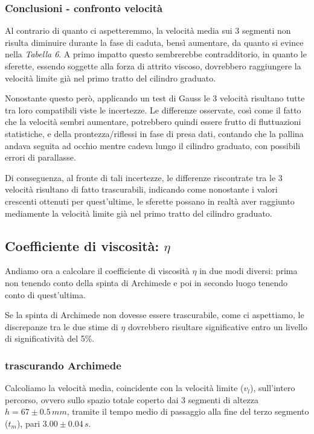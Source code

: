 \documentclass{article}
\begin{document}
\subsubsection{Conclusioni - confronto velocità}
Al contrario di quanto ci aspetteremmo, la velocità media sui 3 segmenti non risulta diminuire durante la fase di caduta, bensì aumentare, da quanto si evince nella \textit{Tabella 6}. A primo impatto questo sembrerebbe contradditorio, in quanto le sferette, essendo soggette alla forza di attrito viscoso, dovrebbero raggiungere la velocità limite già nel primo tratto del cilindro graduato.

Nonostante questo però, applicando un test di Gauss le 3 velocità risultano tutte tra loro compatibili viste le incertezze. Le differenze osservate, così come il fatto che la velocità sembri aumentare, potrebbero quindi essere frutto di fluttuazioni statistiche, e della prontezza/riflessi in fase di presa dati, contando che la pallina andava seguita ad occhio mentre cadeva lungo il cilindro graduato, con possibili errori di parallasse.

Di conseguenza, al fronte di tali incertezze, le differenze riscontrate tra le 3 velocità risultano di fatto trascurabili, indicando come nonostante i valori crescenti ottenuti per quest'ultime, le sferette possano in realtà aver raggiunto mediamente la velocità limite già nel primo tratto del cilindro graduato. 

\subsection{Coefficiente di viscosità: $\eta$}
Andiamo ora a calcolare il coefficiente di viscosità $\eta$ in due modi diversi: prima non tenendo conto della spinta di Archimede e poi in secondo luogo tenendo conto di quest'ultima. 

Se la spinta di Archimede non dovesse essere trascurabile, come ci aspettiamo, le discrepanze tra le due stime di $\eta$ dovrebbero risultare significative entro un livello di significatività del 5\%.
\vspace{0.2cm}
\subsubsection{\bm{$\eta$} trascurando Archimede}
Calcoliamo la velocità media, coincidente con la velocità limite ($v_l$), sull'intero percorso, ovvero sullo spazio totale coperto dai 3 segmenti di altezza $h = 67 \pm 0.5\,mm$, tramite il tempo medio di passaggio alla fine del terzo segmento ($t_m$), pari $3.00 \pm 0.04\,s$.
\vspace{0.2cm}
\end{document}
